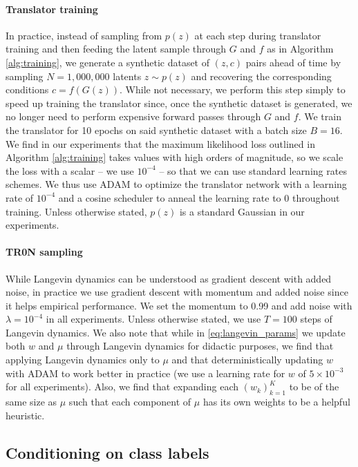 \documentclass[nohyperref]{article}
\theoremstyle{plain}
\theoremstyle{definition}
\theoremstyle{remark}
\begin{document}
\paragraph{Translator training} In practice, instead of sampling from $p(z)$ at each step during translator training and then feeding the latent sample through $G$ and $f$ as in Algorithm \ref{alg:training}, we generate a synthetic dataset of $(z, c)$ pairs ahead of time by sampling $N=1,000,000$ latents $z\sim p(z)$ and recovering the corresponding conditions $c=f(G(z))$. While not necessary, we perform this step simply to speed up training the translator since, once the synthetic dataset is generated, we no longer need to perform expensive forward passes through $G$ and $f$. We train the translator for 10 epochs on said synthetic dataset with a batch size $B=16$. 
We find in our experiments that the maximum likelihood loss outlined in Algorithm \ref{alg:training} takes values with high orders of magnitude, so we scale the loss with a scalar -- we use $10^{-4}$ -- so that we can use standard learning rates schemes. We thus use ADAM to optimize the translator network with a learning rate of $10^{-4}$ and a cosine scheduler to anneal the learning rate to $0$ throughout training. Unless otherwise stated, $p(z)$ is a standard Gaussian in our experiments.

\paragraph{TR0N sampling} While Langevin dynamics can be understood as gradient descent with added noise, in practice we use gradient descent with momentum and added noise since it helps empirical performance. We set the momentum to 0.99 and add noise with $\lambda=10^{-4}$ in all experiments. Unless otherwise stated, we use $T=100$ steps of Langevin dynamics. We also note that while in \eqref{eq:langevin_params} we update both $w$ and $\mu$ through Langevin dynamics for didactic purposes, we find that applying Langevin dynamics only to $\mu$ and that deterministically updating $w$ with ADAM to work better in practice (we use a learning rate for $w$ of $5 \times 10^{-3}$ for all experiments). Also, we find that expanding each $(w_k)_{k=1}^K$ to be of the same size as $\mu$ such that each component of $\mu$ has its own weights to be a helpful heuristic.

\subsection{Conditioning on class labels}
\end{document}
